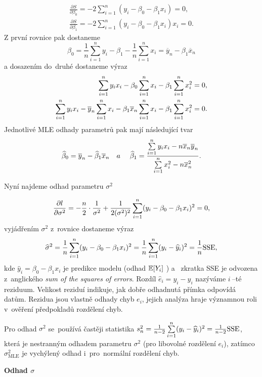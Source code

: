 $$
\begin{aligned}
\frac{\partial S}{\partial \beta_{0}} = - 2 \sum_{i = 1}^{n}( y_{i} -  \beta_{0}  - \beta_{1} x_{i}) = 0 , \\
\frac{\partial S}{\partial \beta_{1}} = - 2 \sum_{i = 1}^{n}( y_{i} -  \beta_{0}  - \beta_{1} x_{i}) x_{i}= 0 .
\end{aligned}
$$
Z první rovnice pak dostaneme
$$
 \beta_{0} = \frac{1}{n} \sum_{i = 1}^{n} y_{i} -  \beta_{1}  - \frac{1}{n} \sum_{i = 1}^{n} x_{i} = \overline{y}_{n} - \beta_{1} \overline{x}_{n}
$$
a dosazením do~druhé dostaneme výraz
$$
\begin{aligned}
\sum\limits_{i=1}^{n} y_{i} x_{i} - \beta_{0} \sum\limits_{i=1}^{n} x_{i} - \beta_{1} \sum\limits_{i=1}^{n} x_{i}^{2} = 0 , \\
\sum\limits_{i=1}^{n} y_{i} x_{i} - \overline{y}_{n} \sum\limits_{i=1}^{n} x_{i} - \beta_{1} \overline{x}_{n} \sum\limits_{i=1}^{n} x_{i} - \beta_{1} \sum\limits_{i=1}^{n} x_{i}^{2} = 0. \\
\end{aligned}
$$
Jednotlivé MLE odhady parametrů pak mají následující tvar
$$
\widehat{\beta}_{0} = \overline{y}_{n} - \widehat{\beta}_{1} \overline{x}_{n} \quad a~\quad
\widehat{\beta}_{1} = \frac{\sum\limits_{i=1}^{n} y_{i} x_{i} - n \overline{x}_{n} \overline{y}_{n}}{\sum\limits_{i=1}^{n} x_{i}^{2} - n \overline{x}_{n}^{2}}.
$$

Nyní najdeme odhad parametru $ \sigma^{2} $ 

$$
\frac{ \partial l}{ \partial \sigma^{2}} = -\frac{n}{2} \cdot \frac{1}{\sigma^{2}} + \frac{1}{2 (\sigma^{2})^{2}} \sum\limits_{i=1}^{n} ( y_{i} -  \beta_{0}  - \beta_{1} x_{i})^{2} = 0,
$$
vyjádřením $ \sigma^{2} $ z~rovnice dostaneme výraz
$$
\widehat{\sigma}^{2} = \frac{1}{n} \sum\limits_{i=1}^{n} ( y_{i} -  \beta_{0}  - \beta_{1} x_{i})^{2} = \frac{1}{n} \sum\limits_{i=1}^{n} ( y_{i} -  \widehat{y}_{i})^{2} = \frac{1}{n} \text{SSE},
$$
kde $ \widehat{y}_{i} = \beta_{0}  - \beta_{1} x_{i} $ je predikce modelu (odhad $ \mathbb{E} [ Y_{i} ] $ ) a~ zkratka SSE je odvozena z~anglického \textit{sum of the squares of errors}. Rozdíl $ \widehat{e}_{i} = y_{i} -  \widehat{y}_{i} $ nazýváme $ i~$--té reziduum. Velikost reziduí indikuje, jak dobře odhadnutá přímka odpovídá datům. Rezidua jsou vlastně odhady chyb $ e_{i} $,  jejich analýza hraje významnou roli v~ověření předpokladů rozdělení chyb.

\begin{remark}
Pro odhad $ \sigma^{2} $ se~používá častěji statistika $ s^{2}_{n} = \frac{1}{n - 2} \sum\limits_{i=1}^{n}(y_{i} -  \widehat{y}_{i})^{2} = \frac{1}{n-2} \text{SSE} $, která je nestranným odhadem parametru $ \sigma^{2} $ (pro libovolné rozdělení $ e_{i} $), zatímco $ \sigma^{2}_{\text{MLE}} $ je vychýlený odhad i~pro~normální rozdělení chyb.
\end{remark}
\textbf{Odhad $ \sigma $}

